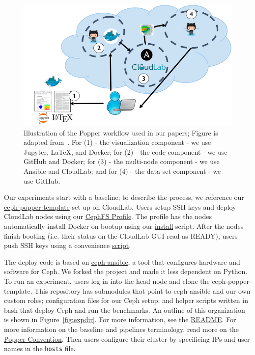 \begin{figure}[tb] 
  \centering
  \includegraphics[width=1\linewidth]{./figures/workflow.png}
  \caption{Illustration of the Popper workflow used in our papers; Figure is
adapted from~\cite{jimenez:ipdpsw17-popper}. For (1) - the visualization
component - we use Jupyter, \LaTeX, and Docker; for (2) - the code component -
we use GitHub and Docker; for (3) - the multi-node component - we use Ansible
and CloudLab; and for (4) - the data set component - we use GitHub.}
  \label{fig:workflow}
\end{figure}

Our experiments start with a baseline; to describe the process, we reference
our
\href{https://github.com/michaelsevilla/ceph-popper-template}{ceph-popper-template}
set up on CloudLab. Users setup SSH keys and deploy CloudLab nodes using our
\href{https://www.cloudlab.us/p/CephFS/CephFS-HEP}{CephFS Profile}.  The
profile has the nodes automatically install Docker on bootup using our
\href{https://github.com/michaelsevilla/ceph-popper-template/blob/master/hardware/cloudlab/install.sh}{install}
script. After the nodes finish booting (i.e.  their status on the CloudLab GUI
read as READY), users push SSH keys using a convenience
\href{https://raw.githubusercontent.com/michaelsevilla/ceph-popper-template/master/hardware/cloudlab/pushkeys.sh}{script}.

The deploy code is based on
\href{https://github.com/ceph/ceph-ansible/wiki}{ceph-ansible}, a tool that
configures hardware and software for Ceph. We forked the project and made it
less dependent on Python. To run an experiment, users log in into the head node
and clone the ceph-popper-template. This repository has submodules that point
to ceph-ansible and our own custom roles; configuration files for our Ceph
setup; and helper scripts written in bash that deploy Ceph and run the
benchmarks. An outline of this organization is shown in
Figure~\ref{fig:expdir}.  For more information, see the
\href{https://github.com/michaelsevilla/ceph-popper-template}{README}. For more
information on the baseline and pipelines terminology, read more on the
\href{http://falsifiable.us/}{Popper Convention}. Then users configure their
cluster by specificing IPs and user names in the \texttt{hosts} file. 

